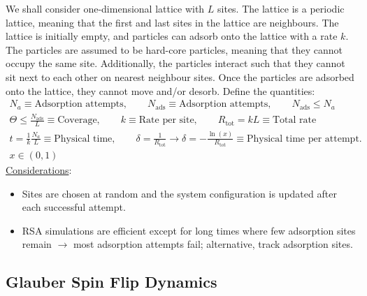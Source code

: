 \documentclass[letterpaper]{article}
\begin{document}
    We shall consider one-dimensional lattice with $L$ sites. The lattice is
    a periodic lattice, meaning that the first and last sites in the lattice
    are neighbours. The lattice is initially empty, and particles can adsorb
    onto the lattice with a rate $k$. The particles are assumed to be
    hard-core particles, meaning that they cannot occupy the same site.
    Additionally, the particles interact such that they cannot sit next to
    each other on nearest neighbour sites. Once the particles are adsorbed onto
    the lattice, they cannot move and/or desorb.\bigbreak
    Define the quantities:
    \begin{gather*}
        N_{a}\equiv\text{Adsorption attempts},\qquad
        N_{\text{ads}}\equiv\text{Adsorption attempts},\qquad
        N_{\text{ads}} \leq N_{a}\\
        \Theta\leq\frac{N_{\text{ads}}}{L}\equiv\text{Coverage},\qquad
        k\equiv\text{Rate per site},\qquad
        R_{\text{tot}}=kL\equiv\text{Total rate}\\
        t = \frac{1}{k}\frac{N_{a}}{L}\equiv\text{Physical time},\qquad
        \delta = \frac{1}{R_{\text{tot}}}\rightarrow
        \delta = -\frac{\ln\left(x\right)}{R_{\text{tot}}}\equiv
        \text{{Physical time per attempt.}}\\
        x\in\left(0,1\right)
    \end{gather*}
    \underline{Considerations}:
    \begin{itemize}
        \item Sites are chosen at random and the system configuration is updated
        after each successful attempt.
        \item RSA simulations are efficient except for long times where few
        adsorption sites remain $\rightarrow$ most adsorption attempts fail;
        alternative, track adsorption sites.
    \end{itemize} 


    \subsection{Glauber Spin Flip Dynamics}
\end{document}
